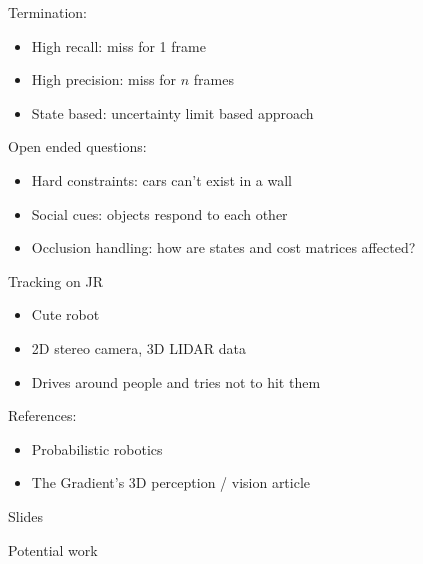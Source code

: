 \documentclass{article}
\begin{document}
Termination:
\begin{itemize}
  \item High recall: miss for 1 frame
  \item High precision: miss for $n$ frames
  \item State based: uncertainty limit based approach
\end{itemize}

Open ended questions:
\begin{itemize}
  \item Hard constraints: cars can't exist in a wall
  \item Social cues: objects respond to each other
  \item Occlusion handling: how are states and cost matrices affected?
\end{itemize}

Tracking on JR
\begin{itemize}
  \item Cute robot
  \item 2D stereo camera, 3D LIDAR data
  \item Drives around people and tries not to hit them
\end{itemize}

References:
\begin{itemize}
  \item Probabilistic robotics
  \item The Gradient's 3D perception / vision article
\end{itemize}

Slides

Potential work
\end{document}
